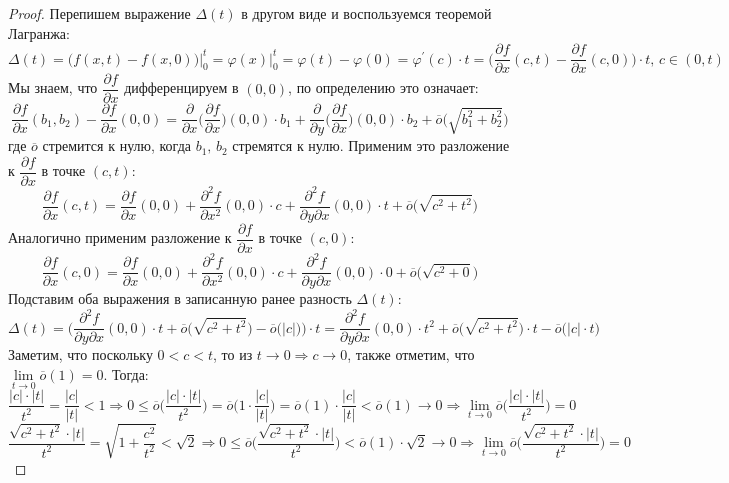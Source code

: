 \documentclass[12pt]{article}
\theoremstyle{definition}
\begin{document}
\begin{proof}
	Перепишем выражение $\Delta(t)$ в другом виде и воспользуемся теоремой Лагранжа:
	$$
		\Delta(t) = \Big(f(x,t) - f(x,0)\Big)\Big|_0^t = \varphi(x)\Big|_0^t =  \varphi(t) - \varphi(0) = \varphi^\prime(c){\cdot}t = \bigg(\dfrac{\partial f}{\partial x}(c,t) - \dfrac{\partial f}{\partial x}(c,0)\bigg){\cdot}t, \, c \in (0,t)
	$$
	Мы знаем, что $\dfrac{\partial f}{\partial x}$ дифференцируем в $(0,0)$, по определению это означает:
	$$
		\dfrac{\partial f}{\partial x}(b_1,b_2) - \dfrac{\partial f}{\partial x}(0,0) = \dfrac{\partial}{\partial x}\bigg( \dfrac{\partial f}{\partial x}\bigg)(0,0){\cdot}b_1 + \dfrac{\partial}{\partial y}\bigg( \dfrac{\partial f}{\partial x}\bigg)(0,0){\cdot}b_2 + \overline{o}\Big(\sqrt{b_1^2 + b_2^2}\Big)
	$$
	где $\overline{o}$ стремится к нулю, когда $b_1, \, b_2$ стремятся к нулю. Применим это разложение к $\dfrac{\partial f}{\partial x}$ в точке $(c,t)$:
	$$
		\dfrac{\partial f}{\partial x}(c,t) = \dfrac{\partial f}{\partial x}(0,0) + \dfrac{\partial^2 f}{\partial x^2}(0,0){\cdot}c + \dfrac{\partial^2 f}{\partial y \partial x}(0,0){\cdot}t + \overline{o}\Big(\sqrt{c^2 + t^2}\Big)
	$$
	Аналогично применим разложение к $\dfrac{\partial f}{\partial x}$ в точке $(c,0)$:
	$$
		\dfrac{\partial f}{\partial x}(c,0) = \dfrac{\partial f}{\partial x}(0,0) + \dfrac{\partial^2 f}{\partial x^2}(0,0){\cdot}c + \dfrac{\partial^2 f}{\partial y \partial x}(0,0){\cdot}0 + \overline{o}\Big(\sqrt{c^2 + 0}\Big)
	$$
	Подставим оба выражения в записанную ранее разность $\Delta(t)$:
	$$
		\Delta(t) = \bigg(\dfrac{\partial^2 f}{\partial y \partial x}(0,0){\cdot}t + \overline{o}\Big(\sqrt{c^2 + t^2}\Big) - \overline{o}\big(|c|\big)\bigg){\cdot}t = \dfrac{\partial^2 f}{\partial y \partial x}(0,0){\cdot}t^2 + \overline{o}\Big(\sqrt{c^2 + t^2}\Big){\cdot}t - \overline{o}\big(|c|{\cdot}t\big)
	$$
	Заметим, что поскольку $0 < c < t$, то из $t \to 0 \Rightarrow c \to 0$, также отметим, что $\lim\limits_{t \to 0}\overline{o}(1) = 0$. Тогда:
	$$
		\dfrac{|c|{\cdot}|t|}{t^2} = \dfrac{|c|}{|t|} < 1 \Rightarrow 
		0 \leq \overline{o}\bigg(\dfrac{|c|{\cdot}|t|}{t^2}\bigg) = \overline{o}\bigg(1{\cdot} \dfrac{|c|}{|t|}\bigg) = \overline{o}(1){\cdot} \dfrac{|c|}{|t|} < \overline{o}(1) \to 0 \Rightarrow 
		\lim\limits_{t\to 0} \overline{o}\bigg(\dfrac{|c|{\cdot}|t|}{t^2}\bigg) = 0
	$$
	$$
		\dfrac{\sqrt{c^2 + t^2}{\cdot}|t|}{t^2} = \sqrt{1 + \dfrac{c^2}{t^2}}  < \sqrt{2} \Rightarrow 
		0 \leq \overline{o}\bigg(\dfrac{\sqrt{c^2 + t^2}{\cdot}|t|}{t^2}\bigg) < \overline{o}(1){\cdot}\sqrt{2} \to 0 \Rightarrow 
		\lim\limits_{t\to 0}\overline{o}\bigg(\dfrac{\sqrt{c^2 + t^2}{\cdot}|t|}{t^2}\bigg) = 0
$$
\end{proof}
\end{document}
